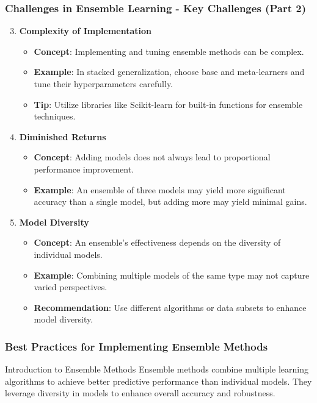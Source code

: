\documentclass[aspectratio=169]{beamer}
\begin{document}
\begin{frame}[fragile]
    \frametitle{Challenges in Ensemble Learning - Key Challenges (Part 2)}
    \begin{enumerate}
        \setcounter{enumi}{2} %
        \item \textbf{Complexity of Implementation}
            \begin{itemize}
                \item \textbf{Concept}: Implementing and tuning ensemble methods can be complex.
                \item \textbf{Example}: In stacked generalization, choose base and meta-learners and tune their hyperparameters carefully.
                \item \textbf{Tip}: Utilize libraries like Scikit-learn for built-in functions for ensemble techniques.
            \end{itemize}
        
        \item \textbf{Diminished Returns}
            \begin{itemize}
                \item \textbf{Concept}: Adding models does not always lead to proportional performance improvement.
                \item \textbf{Example}: An ensemble of three models may yield more significant accuracy than a single model, but adding more may yield minimal gains.
            \end{itemize}
        
        \item \textbf{Model Diversity}
            \begin{itemize}
                \item \textbf{Concept}: An ensemble's effectiveness depends on the diversity of individual models.
                \item \textbf{Example}: Combining multiple models of the same type may not capture varied perspectives.
                \item \textbf{Recommendation}: Use different algorithms or data subsets to enhance model diversity.
            \end{itemize}
    \end{enumerate}
\end{frame}

\begin{frame}
    \frametitle{Best Practices for Implementing Ensemble Methods}
    \begin{block}{Introduction to Ensemble Methods}
        Ensemble methods combine multiple learning algorithms to achieve better predictive performance than individual models. They leverage diversity in models to enhance overall accuracy and robustness.
    \end{block}
\end{frame}
\end{document}
